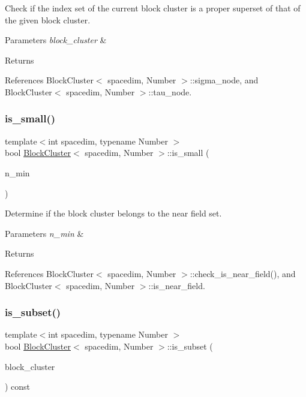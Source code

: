 Check if the index set of the current block cluster is a proper superset of that of the given block cluster. 
\begin{DoxyParams}{Parameters}
{\em block\+\_\+cluster} & \\
\hline
\end{DoxyParams}
\begin{DoxyReturn}{Returns}

\end{DoxyReturn}


References Block\+Cluster$<$ spacedim, Number $>$\+::sigma\+\_\+node, and Block\+Cluster$<$ spacedim, Number $>$\+::tau\+\_\+node.

\mbox{\label{classBlockCluster_adb6edc09ec2c579677e0532644b9f57d}} 
\subsubsection{\texorpdfstring{is\+\_\+small()}{is\_small()}}
{\footnotesize\ttfamily template$<$int spacedim, typename Number $>$ \\
bool \hyperlink{classBlockCluster}{Block\+Cluster}$<$ spacedim, Number $>$\+::is\+\_\+small (\begin{DoxyParamCaption}\item[{unsigned int}]{n\+\_\+min }\end{DoxyParamCaption})}

Determine if the block cluster belongs to the near field set. 
\begin{DoxyParams}{Parameters}
{\em n\+\_\+min} & \\
\hline
\end{DoxyParams}
\begin{DoxyReturn}{Returns}

\end{DoxyReturn}


References Block\+Cluster$<$ spacedim, Number $>$\+::check\+\_\+is\+\_\+near\+\_\+field(), and Block\+Cluster$<$ spacedim, Number $>$\+::is\+\_\+near\+\_\+field.

\mbox{\label{classBlockCluster_af479a9471d056baa51a3f300bd0a5a27}} 
\subsubsection{\texorpdfstring{is\+\_\+subset()}{is\_subset()}}
{\footnotesize\ttfamily template$<$int spacedim, typename Number $>$ \\
bool \hyperlink{classBlockCluster}{Block\+Cluster}$<$ spacedim, Number $>$\+::is\+\_\+subset (\begin{DoxyParamCaption}\item[{const \hyperlink{classBlockCluster}{Block\+Cluster}$<$ spacedim, Number $>$ \&}]{block\+\_\+cluster }\end{DoxyParamCaption}) const}

